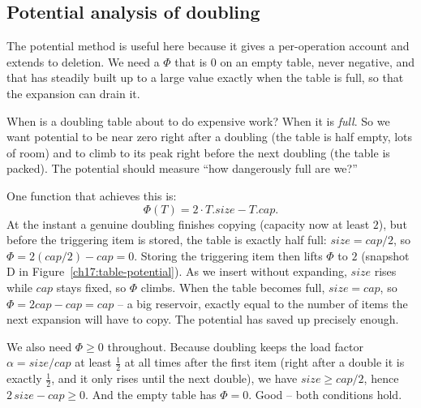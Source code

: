 \subsection{Potential analysis of doubling}

The potential method is useful here because it
gives a per-operation account and extends to deletion. We need a $\Phi$
that is $0$ on an empty table, never negative, and that has steadily built up
to a large value exactly when the table is full, so that the expansion can drain
it.

\begin{intuitionbox}
When is a doubling table about to do expensive work? When it is \emph{full}. So we
want potential to be near zero right after a doubling (the table is half empty,
lots of room) and to climb to its peak right before the next doubling (the table is
packed). The potential should measure ``how dangerously full are we?''
\end{intuitionbox}

One function that achieves this is:
\[
  \Phi(T) = 2 \cdot T.\mathit{size} - T.\mathit{cap}.
\]
At the instant a genuine
doubling finishes copying (capacity now at least $2$), but before the triggering
item is stored, the table is exactly half full: $\mathit{size} = \mathit{cap}/2$,
so $\Phi = 2(\mathit{cap}/2) - \mathit{cap} = 0$. Storing the triggering item then
lifts $\Phi$ to $2$ (snapshot D in Figure~\ref{ch17:table-potential}). As we insert without expanding,
$\mathit{size}$ rises while $\mathit{cap}$ stays fixed, so $\Phi$ climbs. When the
table becomes full, $\mathit{size} = \mathit{cap}$, so
$\Phi = 2\mathit{cap} - \mathit{cap} = \mathit{cap}$ -- a big reservoir, exactly
equal to the number of items the next expansion will have to copy. The potential
has saved up precisely enough.

We also need $\Phi \ge 0$ throughout. Because doubling keeps the load factor
$\alpha = \mathit{size}/\mathit{cap}$ at least $\tfrac12$ at all times after the
first item (right after a double it is exactly $\tfrac12$, and it only rises until
the next double), we have $\mathit{size} \ge \mathit{cap}/2$, hence
$2\,\mathit{size} - \mathit{cap} \ge 0$. And the empty table has $\Phi = 0$. Good --
both conditions hold.

